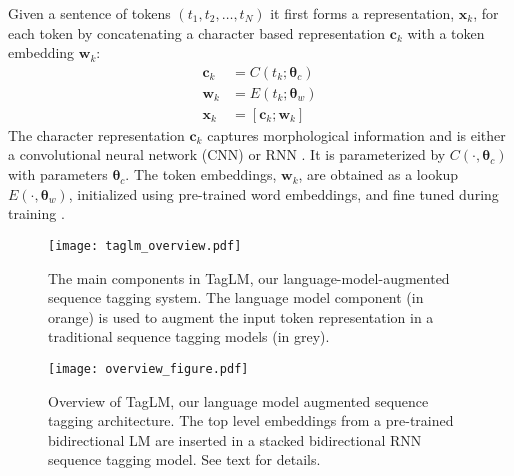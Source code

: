 \documentclass[11pt,a4paper]{article}
\begin{document}
Given a sentence of tokens $(t_1, t_2, \ldots, t_N)$ it first forms a representation, $\mathbf{x}_k$, for each token
by concatenating a character based representation $\mathbf{c}_k$ with a token
embedding $\mathbf{w}_k$:
\begin{align}
\mathbf{c}_k & =  C(t_k; \mathbf{\theta}_c) \nonumber \\
\mathbf{w}_k & =  E(t_k; \mathbf{\theta}_w) \nonumber \\
\mathbf{x}_k & =  [\mathbf{c}_k; \mathbf{w}_k] \label{eqn:token_rep}
\end{align}
The character representation $\mathbf{c}_k$ captures morphological information and
is either a convolutional neural network (CNN) \citep{Ma2016EndtoendSL,chiu-nichols-2016} or RNN \citep{yang-transfer-iclr07,lample-EtAl:2016:N16-1}.  It is parameterized by $C(\cdot, \mathbf{\theta}_c)$ with parameters
$\mathbf{\theta}_c$. The token embeddings, $\mathbf{w}_k$, are obtained as a lookup
$E(\cdot, \mathbf{\theta}_w)$, initialized using pre-trained
word embeddings, and fine tuned during training \citep{NLPfromScratch:Collobert2011}.


\begin{figure}[t]
\begin{center}
\texttt{[image: taglm\_overview.pdf]}
\end{center}
\caption{\label{fig:major_components} The main components in TagLM, our language-model-augmented sequence tagging system. The language model component (in orange) is used to augment the input token representation in a traditional sequence tagging models (in grey).}
\end{figure}

\begin{figure*}[t]
\begin{center}
\texttt{[image: overview\_figure.pdf]}
\end{center}
\caption{\label{overview-figure} Overview of TagLM, our language model augmented sequence tagging architecture.  The top level embeddings from a pre-trained bidirectional LM
are inserted in a stacked bidirectional RNN sequence tagging model.  See text for details.}
\end{figure*}
\end{document}
